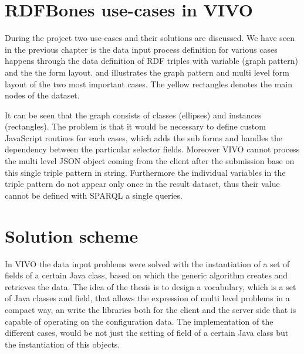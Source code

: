\section{RDFBones use-cases in VIVO}

During the project two use-cases and their solutions are discussed. We have seen in the previous chapter is the data input process definition for various cases happens through the data definition of RDF triples with variable (graph pattern) and the the form layout.  and  illustrates the graph pattern and multi level form layout of the two most important cases. The yellow rectangles denotes the main nodes of the dataset. 



It can be seen that the graph consists of classes (ellipses) and instances (rectangles). The problem is that it would be necessary to define custom JavaScript routines for each cases, which adds the sub forms and handles the dependency between the particular selector fields. Moreover VIVO cannot process the multi level JSON object coming from the client after the submission base on this single triple pattern in string. Furthermore the individual variables in the triple pattern do not appear only once in the result dataset, thus their value cannot be defined with SPARQL a single queries.


\section{Solution scheme}

In VIVO the data input problems were solved with the instantiation of a set of fields of a certain Java class, based on which the generic algorithm creates and retrieves the data. The idea of the thesis is to design a vocabulary, which is a set of Java classes and field, that allows the expression of multi level problems in a compact way, an write the libraries both for the client and the server side that is capable of operating on the configuration data. The implementation of the different cases, would be not just the setting of field of a certain Java class but the instantiation of this objects. 


